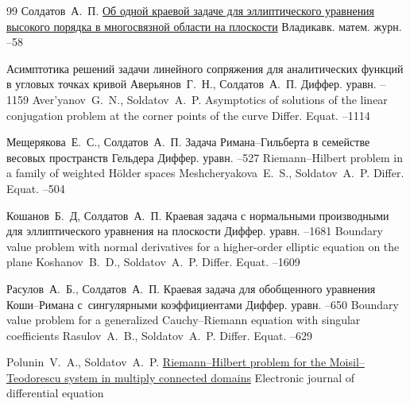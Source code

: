 \begin{thebibliography}{99}
\by Солдатов~А.~П.
\paper \href{http://mi.mathnet.ru/vmj624}{Об одной краевой задаче для эллиптического уравнения высокого порядка в многосвязной области на плоскости}
\jour Владикавк. матем. журн.
--58

\paper Асимптотика решений задачи линейного сопряжения для аналитических функций в угловых точках кривой
\by Аверьянов~Г.~Н., Солдатов~А.~П.
\jour Диффер. уравн.
--1159
\transl
\by Aver'yanov~G.~N.,  Soldatov~A.~P.
\paper Asymptotics of solutions of the linear conjugation problem at the corner points of the curve
\jour Differ. Equat.
--1114 

\by Мещерякова~Е.~С., Солдатов~А.~П.
\paper Задача Римана--Гильберта в семействе весовых пространств Гельдера
\jour Диффер. уравн.
--527 
\transl 
\paper Riemann–Hilbert problem in a family of weighted Hölder spaces
\by Meshcheryakova~E.~S., Soldatov~A.~P.
\jour Differ. Equat.
--504

\by Кошанов~Б.~Д, Солдатов~А.~П.
\paper Краевая задача с нормальными производными для эллиптического уравнения на плоскости
\jour Диффер. уравн.
--1681
\transl
\paper Boundary value problem with normal derivatives for a higher-order elliptic equation on the plane
\by Koshanov~B.~D., Soldatov~A.~P.
\jour Differ. Equat.
--1609

\by Расулов~А.~Б., Солдатов~А.~П.
\paper Краевая задача для обобщенного уравнения Коши--Римана с~сингулярными коэффициентами
\jour Диффер. уравн.
--650
\transl
\paper Boundary value problem for a generalized Cauchy–Riemann equation with singular coefficients
\by Rasulov~A.~B., Soldatov~A.~P.
\jour Differ. Equat.
--629

\by Polunin~V.~A., Soldatov~A.~P.
\paper \href{https://ejde.math.txstate.edu/Volumes/2016/310/polunin.pdf}{Riemann--Hilbert problem for the Moisil--Teodorescu system in multiply connected domains}
\jour Electronic journal of differential equation



\end{thebibliography}

